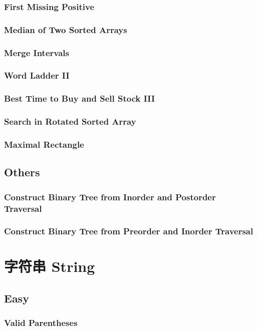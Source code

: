 \documentclass[11pt]{book}
\begin{document}
\subsection{First Missing Positive}
\label{sec-1-3-7}
\subsection{Median of Two Sorted Arrays}
\label{sec-1-3-8}
\subsection{Merge Intervals}
\label{sec-1-3-9}
\subsection{Word Ladder II}
\label{sec-1-3-10}
\subsection{Best Time to Buy and Sell Stock III}
\label{sec-1-3-11}
\subsection{Search in Rotated Sorted Array}
\label{sec-1-3-12}
\subsection{Maximal Rectangle}
\label{sec-1-3-13}
\section{Others}
\label{sec-1-4}
\subsection{Construct Binary Tree from Inorder and Postorder Traversal}
\label{sec-1-4-1}
\subsection{Construct Binary Tree from Preorder and Inorder Traversal}
\label{sec-1-4-2}
\chapter{字符串 String}
\label{sec-2}
\section{Easy}
\label{sec-2-1}
\subsection{Valid Parentheses}
\label{sec-2-1-1}
\end{document}
